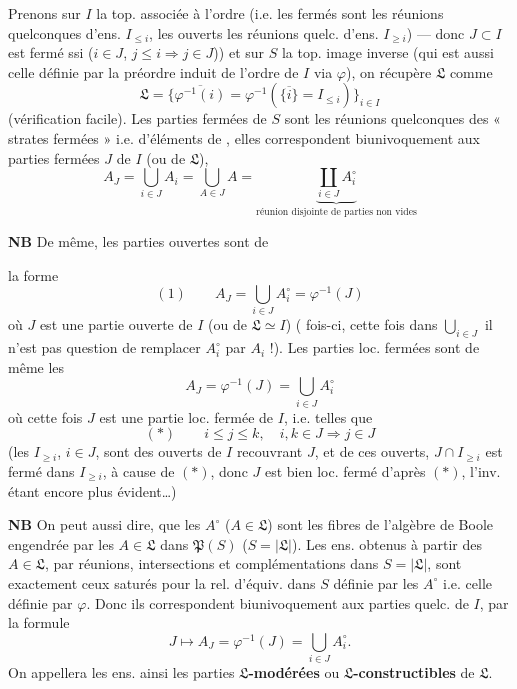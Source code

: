 \documentclass[11pt,a4paper]{article}
\begin{document}
Prenons sur $I$ la top. associée à l'ordre (i.e. les fermés sont les réunions quelconques d'ens. $I_{\leq i}$, les ouverts les réunions quelc. d'ens. $I_{\geq i}$) — donc $J \subset I$ est fermé ssi ($i \in J$, $j \leq i \Rightarrow j \in J$)) et sur $S$ la top. image inverse (qui est aussi celle définie par la préordre induit de l'ordre de $I$ via $\varphi$),  on récupère $\mathfrak{L}$ comme
\[
  \mathfrak{L} = \bigl\{ \overline{\varphi^{-1}(i)} = \varphi^{-1}(\overline{\{i\}} = I_{\leq i}) \bigr\}_{i \in I}
\]
(vérification facile). Les parties fermées de $S$ sont les réunions quelconques des « strates fermées » i.e. d'éléments de , elles correspondent  biunivoquement  aux parties fermées $J$ de $I$ (ou de $\mathfrak{L}$), 
\[
  A_J = \bigcup_{i \in J} A_i = \bigcup_{A \in J} A = \underbrace{\coprod_{i \in J} A_i^{\circ}}_{\text{réunion disjointe de parties non vides}}
\]

\textbf{NB}  De même, les parties ouvertes sont  de

la forme
\[
  (1) \qquad A_J = \bigcup_{i \in J} A_i^{\circ} = \varphi^{-1}(J)
\]
où $J$ est une partie ouverte de $I$ (ou de $\mathfrak{L} \simeq I$) ( fois-ci, cette fois dans $\bigcup_{i \in J}$ il n'est pas question de remplacer $A_i^{\circ}$ par $A_i$ !). Les parties loc. fermées sont de même les
\[
  A_J = \varphi^{-1}(J) = \bigcup_{i \in J} A_i^{\circ}
\]
où cette fois $J$ est une partie loc. fermée de $I$, i.e. telles que
\[
  (*) \qquad i \leq j \leq k, \quad i, k \in J \Longrightarrow j \in J
\]
(les $I_{\geq i}$, $i \in J$, sont des ouverts de $I$ recouvrant $J$, et   de ces ouverts, $J \cap I_{\geq i}$ est fermé dans $I_{\geq i}$, à cause de $(*)$, donc $J$ est bien loc. fermé d'après $(*)$, l'inv. étant encore plus évident…)

\textbf{NB} On peut aussi dire,  que les $A^{\circ}$ ($A \in \mathfrak{L}$) sont les \struck{\ill{}} fibres de l'algèbre de Boole engendrée par les $A \in \mathfrak{L}$ dans $\mathfrak{P}(S)$ ($S = |\mathfrak{L}|$). Les ens. obtenus à partir des $A \in \mathfrak{L}$, par réunions, intersections et complémentations dans $S = |\mathfrak{L}|$, sont exactement ceux saturés pour la rel. d'équiv. dans $S$ définie par les $A^{\circ}$ i.e. celle définie par $\varphi$. Donc ils correspondent biunivoquement aux parties quelc. de $I$, par la formule
\[
  J \longmapsto A_J = \varphi^{-1}(J) = \bigcup_{i \in J} A_i^{\circ} .
\]
On appellera les ens. ainsi  les parties \textbf{$\mathfrak{L}$-modérées} ou \textbf{$\mathfrak{L}$-constructibles} de $\mathfrak{L}$.
\end{document}
